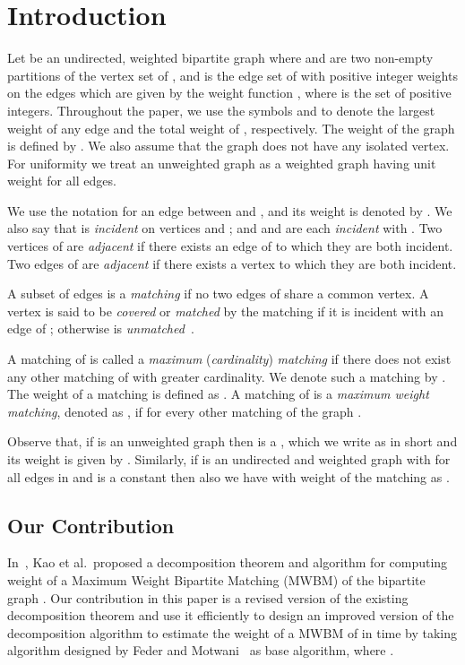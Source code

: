 \documentclass[runningheads,a4paper]{llncs}
\begin{document}
\section{Introduction}
Let 
be an undirected, weighted bipartite graph 
where  and  are two non-empty partitions of the vertex set  of , and  is the edge set of  with
positive integer weights on the edges which are given by the weight function 
, where  is the set of positive integers.  
Throughout the paper, we use the symbols  and    to denote the largest weight of any edge and  the total weight of , respectively.  
The weight of the graph   is defined by
. 
We also assume that the graph does not have any isolated vertex. 
For uniformity we treat an unweighted
graph as a weighted graph having unit weight for all edges.


We use the notation  for an edge  between  and , and its weight is denoted by .
We also say that  is \textit{incident} on vertices  and ;
and  and  are each \textit{incident} with .
Two vertices  of  are \textit{adjacent} if there exists an edge  of  to which they are both incident. 
Two edges  of   are  \textit{adjacent} if there exists a vertex  to which they are both incident. 

A subset  of edges is a \emph{matching} if no two edges of 
share a common vertex. A vertex  is said to be \emph{covered} or
\emph{matched} by the matching  if it is incident with an edge of
; otherwise  is \emph{unmatched}~\cite{bondy82,bondy08}.

A matching  of  is called a \textit{maximum} (\textit{cardinality}) \textit{matching} if there
does not exist any other matching of  with greater cardinality. We denote such a
matching by . The weight of a matching  is defined as
. A matching  of  is a \emph{maximum weight
matching}, denoted as , if  for every other matching
 of the graph .



Observe that, if  is an unweighted graph then  is a , which we write as  in short and its
weight is given by  . Similarly, if  is an
undirected and weighted graph with  for all edges  in 
and  is a constant then also we have  with weight of the
matching as .
\subsection{Our Contribution}
In~\cite{kao99,kao02}, Kao et al.\ proposed a decomposition theorem and algorithm for computing weight of a Maximum Weight Bipartite Matching (MWBM) of the bipartite graph .
Our contribution in this paper is a revised version of the existing decomposition theorem
and use it efficiently to design an improved version of the decomposition algorithm to estimate the weight of a MWBM of  in time
 by taking algorithm designed by Feder and
Motwani~\cite{feder95} as base algorithm, where
. 
\end{document}
